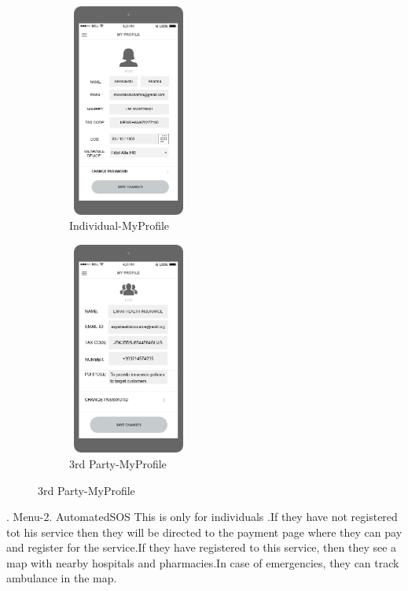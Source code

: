 \begin{figure}[H]
	\centering
	\begin{subfigure}[b]{0.4\textwidth}	
		\includegraphics[width=4cm,height=7cm]		{./Mockups/7_I-MyProfile.jpeg}
      	\caption{Individual-MyProfile}
        \label{TrackMe_indpro}
	 \end{subfigure}
     \begin{subfigure}[b]{0.4\textwidth}	
		\includegraphics[width=4cm,height=7cm]		{./Mockups/7_T-MyProfile.png}
      	\caption{3rd Party-MyProfile}
        \label{TrackMe_3ppro}
	 \end{subfigure}
\end{figure}

.\newline\newline
Menu-2. AutomatedSOS\newline
This is only for individuals .\newline If they have not registered tot his service then they will be directed to the payment page where they can pay and register for the service.\newline If they have registered to this service, then they see a map with nearby hospitals and pharmacies.\newline In case of emergencies, they can track ambulance in the map.

